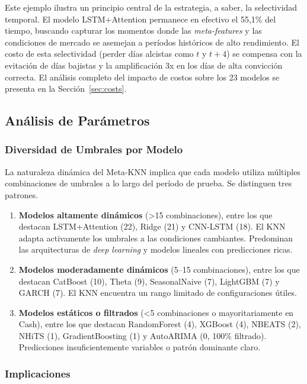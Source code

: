Este ejemplo ilustra un principio central de la estrategia, a saber, la selectividad temporal. El modelo LSTM+Attention permanece en efectivo el 55{,}1\% del tiempo, buscando capturar los momentos donde las \textit{meta-features} y las condiciones de mercado se asemejan a per\'iodos hist\'oricos de alto rendimiento. El costo de esta selectividad (perder d\'ias alcistas como $t$ y $t{+}4$) se compensa con la evitaci\'on de d\'ias bajistas y la amplificaci\'on 3x en los d\'ias de alta convicci\'on correcta. El an\'alisis completo del impacto de costos sobre los 23 modelos se presenta en la Secci\'on~\ref{sec:costs}.

\subsection{An\'alisis de Par\'ametros}
\label{app:param_analysis}

\subsubsection{Diversidad de Umbrales por Modelo}

La naturaleza din\'amica del Meta-KNN implica que cada modelo utiliza m\'ultiples combinaciones de umbrales a lo largo del per\'iodo de prueba. Se distinguen tres patrones.

\begin{enumerate}
    \item \textbf{Modelos altamente din\'amicos} (>15 combinaciones), entre los que destacan LSTM+Attention (22), Ridge (21) y CNN-LSTM (18). El KNN adapta activamente los umbrales a las condiciones cambiantes. Predominan las arquitecturas de \textit{deep learning} y modelos lineales con predicciones ricas.

    \item \textbf{Modelos moderadamente din\'amicos} (5--15 combinaciones), entre los que destacan CatBoost (10), Theta (9), SeasonalNaive (7), LightGBM (7) y GARCH (7). El KNN encuentra un rango limitado de configuraciones \'utiles.

    \item \textbf{Modelos est\'aticos o filtrados} (<5 combinaciones o mayoritariamente en Cash), entre los que destacan RandomForest (4), XGBoost (4), NBEATS (2), NHiTS (1), GradientBoosting (1) y AutoARIMA (0, 100\% filtrado). Predicciones insuficientemente variables o patr\'on dominante claro.
\end{enumerate}

\subsubsection{Implicaciones}

